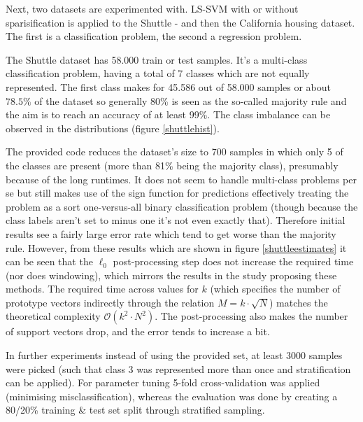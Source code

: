 
Next, two datasets are experimented with. LS-SVM with or without sparisification is applied to the Shuttle - and then the California housing dataset. The first is a classification problem, the second a regression problem.


The Shuttle dataset has 58.000 train or test samples. It's a multi-class classification problem, having a total of 7 classes which are not equally represented. The first class makes for 45.586 out of 58.000 samples or about $78.5\%$ of the dataset so generally 80\% is seen as the so-called majority rule and the aim is to reach an accuracy of at least 99\%. The class imbalance can be observed in the distributions (figure \ref{shuttlehist}).

\par The provided code reduces the dataset's size to 700 samples in which only 5 of the classes are present (more than 81\% being the majority class), presumably because of the long runtimes. It does not seem to handle multi-class problems per se but still makes use of the sign function for predictions effectively treating the problem as a sort one-versus-all binary classification problem (though because the class labels aren't set to minus one it's not even exactly that). Therefore initial results see a fairly large error rate which tend to get worse than the majority rule. However, from these results which are shown in figure \ref{shuttleestimates} it can be seen that the $\ell_0$ post-processing step does not increase the required time (nor does windowing), which mirrors the results in the study proposing these methods. The required time across values for $k$ (which specifies the number of prototype vectors indirectly through the relation $M=k\cdot\sqrt{N}$) matches the theoretical complexity $\mathcal{O}(k^2\cdot N^2)$. The post-processing also makes the number of support vectors drop, and the error tends to increase a bit.

\par In further experiments instead of using the provided set, at least 3000 samples were picked (such that class 3 was represented more than once and stratification can be applied). For parameter tuning 5-fold cross-validation was applied (minimising misclassification), whereas the evaluation was done by creating a 80/20\% training \& test set split through stratified sampling.


